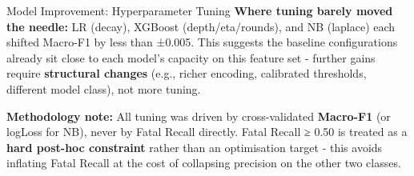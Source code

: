 \documentclass[
  ignorenonframetext,
]{beamer}
\begin{document}
\begin{frame}[fragile]{Model Improvement: Hyperparameter Tuning}
\textbf{Where tuning barely moved the needle:} LR (decay), XGBoost
(depth/eta/rounds), and NB (laplace) each shifted Macro-F1 by less than
±0.005. This suggests the baseline configurations already sit close to
each model's capacity on this feature set - further gains require
\textbf{structural changes} (e.g., richer encoding, calibrated
thresholds, different model class), not more tuning.

\textbf{Methodology note:} All tuning was driven by cross-validated
\textbf{Macro-F1} (or logLoss for NB), never by Fatal Recall directly.
Fatal Recall ≥ 0.50 is treated as a \textbf{hard post-hoc constraint}
rather than an optimisation target - this avoids inflating Fatal Recall
at the cost of collapsing precision on the other two classes.
\end{frame}
\end{document}
